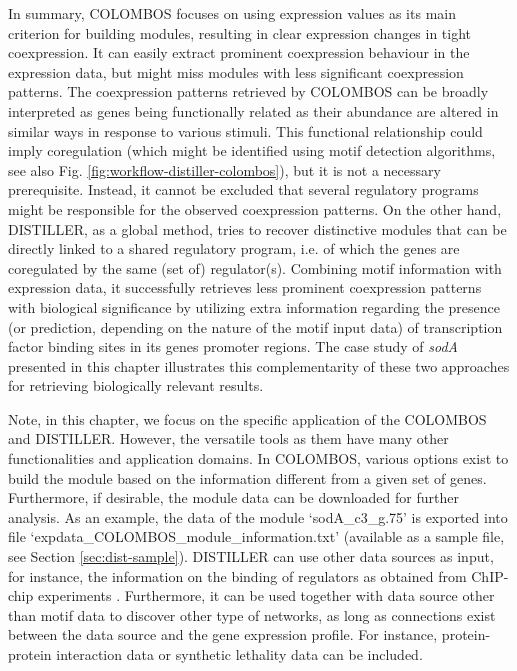 In summary, COLOMBOS focuses on using expression values as its main
criterion for building modules, resulting in clear expression changes in
tight coexpression. It can easily extract prominent coexpression
behaviour in the expression data, but might miss modules with less
significant coexpression patterns. The coexpression patterns retrieved
by COLOMBOS can be broadly interpreted as genes being functionally
related as their abundance are altered in similar ways in response to
various stimuli. This functional relationship could imply coregulation
(which might be identified using motif detection algorithms, see also
Fig. \ref{fig:workflow-distiller-colombos}), but it is not a necessary 
prerequisite. 
Instead, it cannot be excluded that several regulatory programs might be 
responsible for the observed coexpression patterns.
On the other hand, DISTILLER, as a global method, tries to recover
distinctive modules that can be directly linked to a shared regulatory
program, i.e. of which the genes are coregulated by the same (set of)
regulator(s). Combining motif information with expression data, it
successfully retrieves less prominent coexpression patterns with
biological significance by utilizing extra information regarding the
presence (or prediction, depending on the nature of the motif input
data) of transcription factor binding sites in its genes promoter
regions. The case study of \textit{sodA} presented in this chapter illustrates 
this complementarity of these two approaches for retrieving biologically 
relevant results. 


Note, in this chapter, we focus on the specific application of the COLOMBOS 
and DISTILLER.  However, the versatile tools as them have many other 
functionalities and application domains.  
%
In COLOMBOS, various options exist to build the module based on the information 
different from a given set of genes.  Furthermore, if desirable, the module 
data can be downloaded for further analysis.  As an example, the data of the 
module `sodA\_c3\_g.75' is exported into file 
`expdata\_COLOMBOS\_module\_information.txt' (available as a sample file, see 
Section \ref{sec:dist-sample}).
%
DISTILLER can use other data sources as input, for instance, the information 
on the binding of regulators as obtained from ChIP-chip experiments 
\cite{Lemmens2009, Lemmens2006}.
Furthermore, it can be used together with data source other than motif data to 
discover other type of networks, as long as connections exist between the data 
source and the gene expression profile. 
For instance, protein-protein interaction data or synthetic lethality data can 
be included. 




